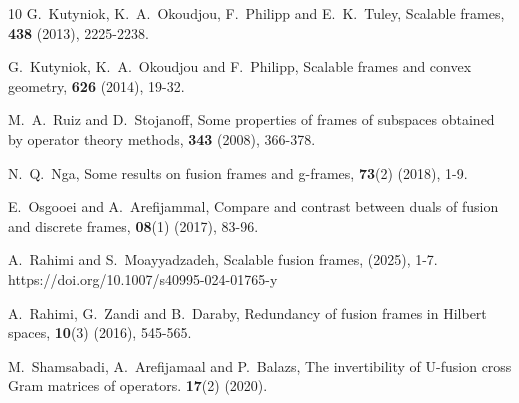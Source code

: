 \documentclass[sn-mathphys-num]{sn-jnl}%
\theoremstyle{definition}
\theoremstyle{remark}
\numberwithin{equation}{section}
\begin{document}
\begin{thebibliography}{10}
G.~Kutyniok, K.~A.~Okoudjou, F.~Philipp and E.~K.~Tuley,
\newblock Scalable frames,
 \textbf{438} (2013), 2225-2238.


G.~Kutyniok, K.~A.~Okoudjou and F.~Philipp,
\newblock Scalable frames and convex geometry,
 \textbf{626} (2014), 19-32.


 



M.~A.~Ruiz and D.~Stojanoff,
\newblock Some properties of frames of subspaces obtained by
operator theory methods,
 \textbf{343} (2008), 366-378. 

N.~Q.~Nga,
\newblock Some results on fusion frames and g-frames,
 \textbf{73}(2) (2018), 1-9. 

E.~Osgooei and A.~Arefijammal,
\newblock Compare and contrast between duals of fusion and discrete frames,
 \textbf{08}(1) (2017), 83-96.

A.~Rahimi and S.~Moayyadzadeh,
\newblock Scalable fusion frames,
 (2025), 1-7.
https://doi.org/10.1007/s40995-024-01765-y

A.~Rahimi, G.~Zandi and B.~Daraby,
\newblock Redundancy of fusion frames in Hilbert spaces,
\textbf{10}(3) (2016), 545-565.

M.~Shamsabadi, A.~Arefijamaal and P.~Balazs, 
\newblock The invertibility of U-fusion cross Gram matrices of operators.
 \textbf{17}(2) (2020).










\end{thebibliography}
\end{document}
